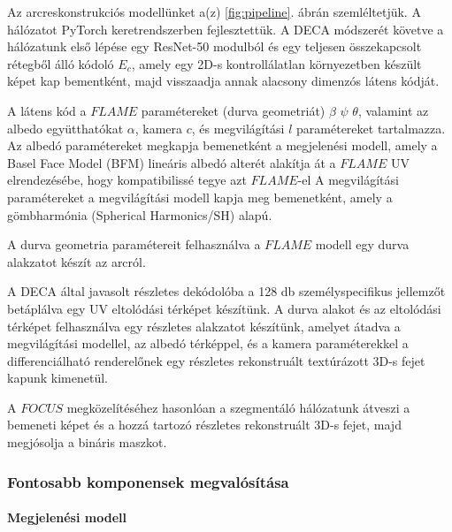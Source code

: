 \documentclass[12pt,a4]{article}
\begin{document}
            \clearpage
         
        	Az arcreskonstrukciós modellünket a(z) \ref{fig:pipeline}. ábrán szemléltetjük. A hálózatot PyTorch
        	keretrendszerben fejlesztettük.
        	A DECA módszerét követve a hálózatunk első lépése egy
        	ResNet-50 modulból és egy teljesen összekapcsolt rétegből álló kódoló
        	$E_{c}$, amely egy 2D-s kontrollálatlan környezetben készült képet kap bementként, majd visszaadja annak alacsony dimenzós látens kódját.
         
            A látens kód a $FLAME$
        	paramétereket (durva geometriát) $\beta$ $\psi$ $\theta$, valamint az albedo együtthatókat
        	$\alpha$, kamera $c$, és megvilágítási $l$ paramétereket tartalmazza.
        	Az albedó paramétereket megkapja
        	bemenetként a megjelenési modell, amely a Basel Face Model (BFM)
        	lineáris albedó alterét alakítja át a $FLAME$ UV elrendezésébe,
        	hogy kompatibilissé tegye azt $FLAME$-el A megvilágítási paramétereket
        	a megvilágítási modell kapja meg bemenetként, amely
        	a gömbharmónia (Spherical Harmonics/SH) alapú.
         
            A durva geometria
        	paramétereit felhasználva a $FLAME$ modell egy durva alakzatot készít az
        	arcról. 
 
            A DECA által javasolt részletes dekódolóba a 128 db személyspecifikus jellemzőt betáplálva egy UV eltolódási térképet készítünk. A durva alakot és az eltolódási térképet felhasználva egy részletes alakzatot készítünk, amelyet átadva a megvilágítási modellel,
        	az albedó térképpel, és a kamera paraméterekkel a differenciálható renderelőnek egy részletes rekonstruált textúrázott 3D-s fejet kapunk kimenetül.

 
        	A $FOCUS$ megközelítéséhez hasonlóan a szegmentáló hálózatunk átveszi
        	a bemeneti képet és a hozzá tartozó részletes rekonstruált 3D-s fejet, majd
        	megjósolja a bináris maszkot.

         \subsubsection{Fontosabb komponensek megvalósítása}

         \paragraph{Megjelenési modell}
\end{document}
